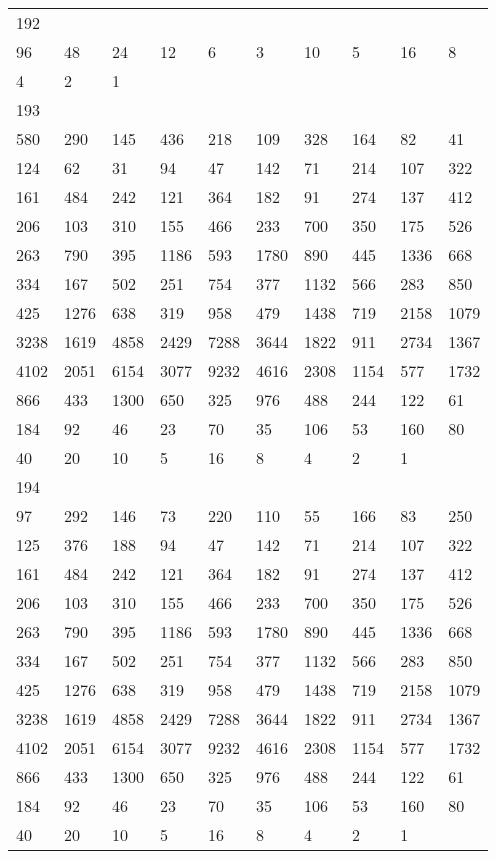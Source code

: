\begin{longtable}{*{10}{l}}
192&&&&&&&&&\\
96& 48& 24& 12& 6& 3& 10& 5& 16& 8\\
4& 2& 1& \\

193&&&&&&&&&\\
580& 290& 145& 436& 218& 109& 328& 164& 82& 41\\
124& 62& 31& 94& 47& 142& 71& 214& 107& 322\\
161& 484& 242& 121& 364& 182& 91& 274& 137& 412\\
206& 103& 310& 155& 466& 233& 700& 350& 175& 526\\
263& 790& 395& 1186& 593& 1780& 890& 445& 1336& 668\\
334& 167& 502& 251& 754& 377& 1132& 566& 283& 850\\
425& 1276& 638& 319& 958& 479& 1438& 719& 2158& 1079\\
3238& 1619& 4858& 2429& 7288& 3644& 1822& 911& 2734& 1367\\
4102& 2051& 6154& 3077& 9232& 4616& 2308& 1154& 577& 1732\\
866& 433& 1300& 650& 325& 976& 488& 244& 122& 61\\
184& 92& 46& 23& 70& 35& 106& 53& 160& 80\\
40& 20& 10& 5& 16& 8& 4& 2& 1& \\

194&&&&&&&&&\\
97& 292& 146& 73& 220& 110& 55& 166& 83& 250\\
125& 376& 188& 94& 47& 142& 71& 214& 107& 322\\
161& 484& 242& 121& 364& 182& 91& 274& 137& 412\\
206& 103& 310& 155& 466& 233& 700& 350& 175& 526\\
263& 790& 395& 1186& 593& 1780& 890& 445& 1336& 668\\
334& 167& 502& 251& 754& 377& 1132& 566& 283& 850\\
425& 1276& 638& 319& 958& 479& 1438& 719& 2158& 1079\\
3238& 1619& 4858& 2429& 7288& 3644& 1822& 911& 2734& 1367\\
4102& 2051& 6154& 3077& 9232& 4616& 2308& 1154& 577& 1732\\
866& 433& 1300& 650& 325& 976& 488& 244& 122& 61\\
184& 92& 46& 23& 70& 35& 106& 53& 160& 80\\
40& 20& 10& 5& 16& 8& 4& 2& 1& \\


\end{longtable}
